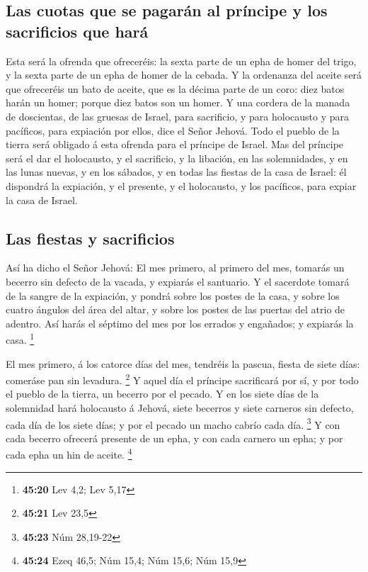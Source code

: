 \hypertarget{las-cuotas-que-se-pagaruxe1n-al-pruxedncipe-y-los-sacrificios-que-haruxe1}{%
\subsection{Las cuotas que se pagarán al príncipe y los sacrificios que
hará}\label{las-cuotas-que-se-pagaruxe1n-al-pruxedncipe-y-los-sacrificios-que-haruxe1}}

 Esta será la ofrenda que ofreceréis: la sexta parte de un
epha de homer del trigo, y la sexta parte de un epha de homer de la
cebada.  Y la ordenanza del aceite será que ofreceréis un
bato de aceite, que es la décima parte de un coro: diez batos harán un
homer; porque diez batos son un homer.  Y una cordera de la
manada de doscientas, de las gruesas de Israel, para sacrificio, y para
holocausto y para pacíficos, para expiación por ellos, dice el Señor
Jehová.  Todo el pueblo de la tierra será obligado á esta
ofrenda para el príncipe de Israel.  Mas del príncipe será
el dar el holocausto, y el sacrificio, y la libación, en las
solemnidades, y en las lunas nuevas, y en los sábados, y en todas las
fiestas de la casa de Israel: él dispondrá la expiación, y el presente,
y el holocausto, y los pacíficos, para expiar la casa de Israel.

\hypertarget{las-fiestas-y-sacrificios}{%
\subsection{Las fiestas y sacrificios}\label{las-fiestas-y-sacrificios}}

 Así ha dicho el Señor Jehová: El mes primero, al primero
del mes, tomarás un becerro sin defecto de la vacada, y expiarás el
santuario.  Y el sacerdote tomará de la sangre de la
expiación, y pondrá sobre los postes de la casa, y sobre los cuatro
ángulos del área del altar, y sobre los postes de las puertas del atrio
de adentro.  Así harás el séptimo del mes por los errados y
engañados; y expiarás la casa. \footnote{\textbf{45:20} Lev 4,2; Lev
  5,17}

 El mes primero, á los catorce días del mes, tendréis la
pascua, fiesta de siete días: comeráse pan sin levadura. \footnote{\textbf{45:21}
  Lev 23,5}  Y aquel día el príncipe sacrificará por sí, y
por todo el pueblo de la tierra, un becerro por el pecado. 
Y en los siete días de la solemnidad hará holocausto á Jehová, siete
becerros y siete carneros sin defecto, cada día de los siete días; y por
el pecado un macho cabrío cada día. \footnote{\textbf{45:23} Núm
  28,19-22}  Y con cada becerro ofrecerá presente de un
epha, y con cada carnero un epha; y por cada epha un hin de aceite.
\footnote{\textbf{45:24} Ezeq 46,5; Núm 15,4; Núm 15,6; Núm 15,9}


